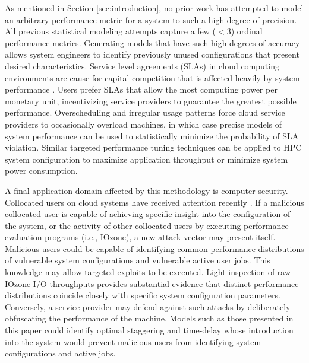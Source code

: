 \documentclass[letterpaper, 10 pt, conference]{ieeeconf}  %
\begin{document}
As mentioned in Section \ref{sec:introduction}, no prior work has attempted to model an arbitrary performance metric for a system to such a high degree of precision. All previous statistical modeling attempts capture a few ($<3$) ordinal performance metrics. Generating models that have such high degrees of accuracy allows system engineers to identify previously unused configurations that present desired characteristics. Service level agreements (SLAs) in cloud computing environments are cause for capital competition that is affected heavily by system performance \cite{patel2009service}. Users prefer SLAs that allow the most computing power per monetary unit, incentivizing service providers to guarantee the greatest possible performance. Overscheduling and irregular usage patterns force cloud service providers to occasionally overload machines, in which case precise models of system performance can be used to statistically minimize the probability of SLA violation. Similar targeted performance tuning techniques can be applied to HPC system configuration to maximize application throughput or minimize system power consumption.

A final application domain affected by this methodology is computer security. Collocated users on cloud systems have received attention recently \cite{ali2015security}. If a malicious collocated user is capable of achieving specific insight into the configuration of the system, or the activity of other collocated users by executing performance evaluation programs (i.e., IOzone), a new attack vector may present itself. Malicious users could be capable of identifying common performance distributions of vulnerable system configurations and vulnerable active user jobs. This knowledge may allow targeted exploits to be executed. Light inspection of raw IOzone I/O throughputs provides substantial evidence that distinct performance distributions coincide closely with specific system configuration parameters. Conversely, a service provider may defend against such attacks by deliberately obfuscating the performance of the machine. Models such as those presented in this paper could identify optimal staggering and time-delay whose introduction into the system would prevent malicious users from identifying system configurations and active jobs.
\end{document}
